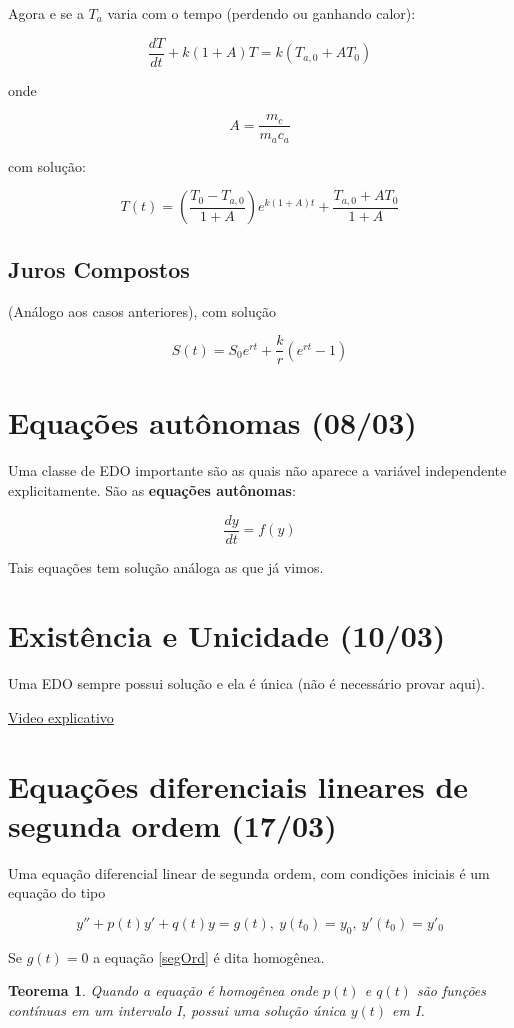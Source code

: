 \documentclass[12pt]{article}
\newtheorem{theorem}{Teorema}[section]
\begin{document}
Agora e se a $T_a$ varia com o tempo (perdendo ou ganhando calor):

$$\dfrac{d T}{d t} + k (1 + A) T = k (T_{a,0} + A T_0)$$

onde

$$A = \dfrac{m_c}{m_a c_a}$$

com solução:

$$T(t) = \left ( \dfrac{T_0 - T_{a, 0}}{1 + A} \right ) e^{k (1 + A) t} + \dfrac{T_{a, 0} + A T_0}{1 + A}$$

\subsection*{Juros Compostos}
(Análogo aos casos anteriores), com solução

$$S(t) = S_0 e^{r t} + \dfrac{k}{r} (e^{r t} - 1)$$

\section{Equações autônomas (08/03)}
Uma classe de EDO importante são as quais não aparece a variável independente explicitamente. São as \textbf{equações autônomas}:

$$\dfrac{d y}{d t} = f(y)$$

Tais equações tem solução análoga as que já vimos.

\section{Existência e Unicidade (10/03)}
Uma EDO sempre possui solução e ela é única (não é necessário provar aqui).

\href{https://www.youtube.com/watch?v=01FK-H7Kbpk&t=1s}{Video explicativo}

\section{Equações diferenciais lineares de segunda ordem (17/03)}
Uma equação diferencial linear de segunda ordem, com condições iniciais é um equação do tipo

\begin{equation}\label{segOrd}
    y'' + p(t) y' + q(t)y = g(t), \ y(t_0) = y_0, \ y'(t_0) = y'_0
\end{equation}

Se $g(t) = 0$ a equação \ref{segOrd} é dita homogênea.

\begin{theorem}
    Quando a equação é homogênea onde $p(t)$ e $q(t)$ são funções contínuas em um intervalo I, possui uma solução única $y(t)$ em I.
\end{theorem}
\end{document}
